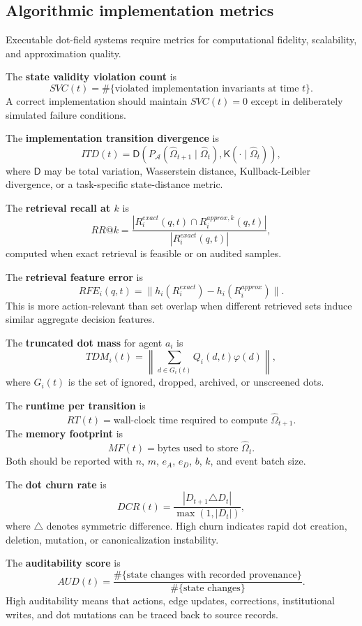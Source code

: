 \documentclass[11pt]{article}
\theoremstyle{remark}
\begin{document}
\subsection{Algorithmic implementation metrics}\label{algorithmic-implementation-metrics}

Executable dot-field systems require metrics for computational fidelity,
scalability, and approximation quality.

The \textbf{state validity violation count} is
$$
SVC(t)=\#\{\text{violated implementation invariants at time }t\}.
$$
A correct implementation should maintain $SVC(t)=0$ except in deliberately
simulated failure conditions.

The \textbf{implementation transition divergence} is
$$
ITD(t)=\mathsf D\left(P_{\mathcal A}(\widehat\Omega_{t+1}\mid\widehat\Omega_t),
\mathsf K(\cdot\mid\widehat\Omega_t)\right),
$$
where $\mathsf D$ may be total variation, Wasserstein distance,
Kullback-Leibler divergence, or a task-specific state-distance metric.

The \textbf{retrieval recall at $k$} is
$$
RR@k=\frac{|R_i^{exact}(q,t)\cap R_i^{approx,k}(q,t)|}{|R_i^{exact}(q,t)|},
$$
computed when exact retrieval is feasible or on audited samples.

The \textbf{retrieval feature error} is
$$
RFE_i(q,t)=\|h_i(R_i^{exact})-h_i(R_i^{approx})\|.
$$
This is more action-relevant than set overlap when different retrieved
sets induce similar aggregate decision features.

The \textbf{truncated dot mass} for agent $a_i$ is
$$
TDM_i(t)=\left\|\sum_{d\in G_i(t)}Q_i(d,t)\varphi(d)\right\|,
$$
where $G_i(t)$ is the set of ignored, dropped, archived, or unscreened
dots.

The \textbf{runtime per transition} is
$$
RT(t)=\text{wall-clock time required to compute }\widehat\Omega_{t+1}.
$$
The \textbf{memory footprint} is
$$
MF(t)=\text{bytes used to store }\widehat\Omega_t.
$$
Both should be reported with $n$, $m$, $e_A$, $e_D$, $b$, $k$, and event
batch size.

The \textbf{dot churn rate} is
$$
DCR(t)=\frac{|D_{t+1}\triangle D_t|}{\max(1,|D_t|)},
$$
where $\triangle$ denotes symmetric difference. High churn indicates
rapid dot creation, deletion, mutation, or canonicalization instability.

The \textbf{auditability score} is
$$
AUD(t)=\frac{\#\{\text{state changes with recorded provenance}\}}{\#\{\text{state changes}\}}.
$$
High auditability means that actions, edge updates, corrections,
institutional writes, and dot mutations can be traced back to source
records.
\end{document}
